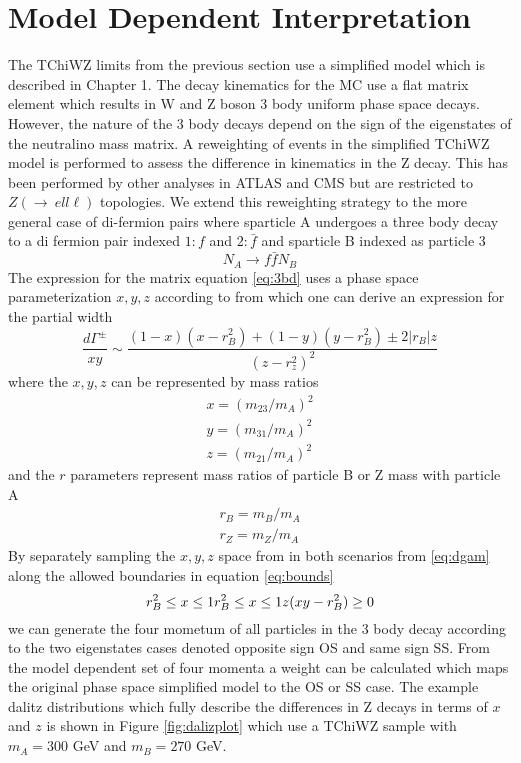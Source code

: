 \section{Model Dependent Interpretation}
The TChiWZ limits from the previous section use a simplified model which is described in Chapter 1. The decay kinematics for the MC use a flat matrix element which results in  W and Z boson 3 body uniform phase space decays. However, the nature of the 3 body decays depend on the sign of the eigenstates of the neutralino mass matrix. A reweighting of events in the simplified TChiWZ model is performed to assess the difference in kinematics in the Z decay. This has been performed by other analyses in ATLAS and CMS \cite{cms1}\cite{alts} but are restricted to $Z(\rightarrow \ ell\ell)$ topologies. We extend this reweighting strategy to the more general case of di-fermion pairs where sparticle A undergoes a three body decay to a di fermion pair indexed $1:f$ and $2:\bar{f}$ and sparticle B indexed as particle 3 
\begin{equation}
\label{eq:3bd}
N_A \rightarrow f \bar{f} N_B
\end{equation}
The expression for the matrix equation \ref{eq:3bd} uses a phase space parameterization $x,y,z$ according to \cite{Nojiri:1999ki} from which one can derive an expression for the partial width 
\begin{equation}
\label{eq:dgam}
\frac{d\Gamma^\pm}{xy}\sim \frac{(1-x)(x-r_B^2)+(1-y)(y-r_B^2)\pm 2|r_B|z}{(z-r_z^2)^2}
\end{equation}
where the $x,y,z$ can be represented by mass ratios
\begin{equation}
\begin{split}
x=(m_{23}/m_A)^2 \\
y=(m_{31}/m_A)^2 \\
z=(m_{21}/m_A)^2 
\end{split}
\end{equation} 
and the $r$ parameters represent mass ratios of particle B or Z mass with particle A
\begin{equation}
\begin{split}
r_B = m_B/m_A \\
r_Z = m_Z/m_A 
\end{split}
\end{equation}
By separately sampling the $x,y,z$ space from in both scenarios from \ref{eq:dgam} along the allowed boundaries in equation \ref{eq:bounds}
\begin{equation}
\label{eq:bound}
r_B^2 \leq x \leq 1 \\
r_B^2 \leq x \leq 1 \\
z(xy-r_B^2) \geq 0
\end{equation}
we can generate the four mometum of all particles in the 3 body decay according to the two eigenstates cases denoted opposite sign OS and same sign SS. From the model dependent set of four momenta a weight can be calculated which maps the original phase space simplified model to the OS or SS case. The example dalitz distributions which fully describe the differences in Z decays in terms of $x$ and $z$ is shown in Figure \ref{fig:dalizplot} which use a TChiWZ sample with $m_A = 300$ GeV and $m_B= 270$ GeV.

